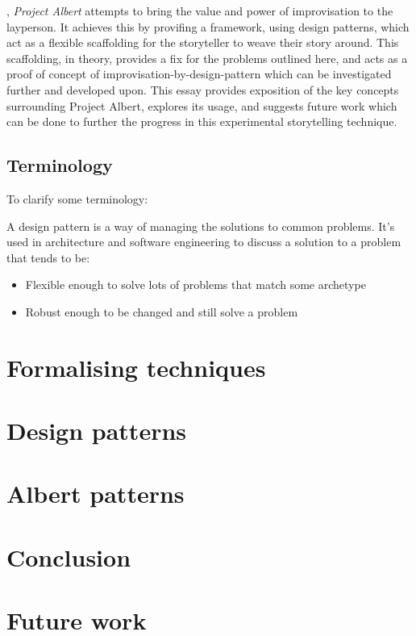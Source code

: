 \documentclass{tufte-handout}
\begin{document}
, \emph{Project Albert} attempts to bring the value and power of improvisation to the layperson. It achieves this by provifing a framework, using design patterns, which act as a flexible scaffolding for the storyteller to weave their story around. This scaffolding, in theory, provides a fix for the problems outlined here, and acts as a proof of concept of improvisation-by-design-pattern which can be investigated further and developed upon. This essay provides exposition of the key concepts surrounding Project Albert, explores its usage, and suggests future work which can be done to further the progress in this experimental storytelling technique.

\subsection{Terminology}
To clarify some terminology:
\begin{description}[align=right,labelwidth=3cm]
    \item [Design Pattern:] A design pattern is a way of managing the solutions to common problems. It's used in architecture and software engineering to discuss a solution to a problem that tends to be:
		\begin{itemize}
			\item Flexible enough to solve lots of problems that match some archetype
			\item Robust enough to be changed and still solve a problem
        \end{itemize}\end{description}

\section{Formalising techniques}


\section{Design patterns}

\section{Albert patterns}

\section{Conclusion}

\section{Future work}
\end{document}
